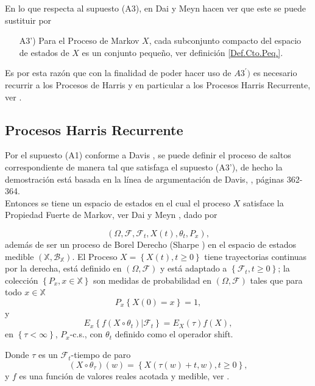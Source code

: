 En lo que respecta al supuesto (A3), en Dai y Meyn \cite{DaiSean}
hacen ver que este se puede sustituir por

\begin{itemize}
\item[A3')] Para el Proceso de Markov $X$, cada subconjunto
compacto del espacio de estados de $X$ es un conjunto peque\~no,
ver definici\'on \ref{Def.Cto.Peq.}.
\end{itemize}

Es por esta raz\'on que con la finalidad de poder hacer uso de
$A3^{'})$ es necesario recurrir a los Procesos de Harris y en
particular a los Procesos Harris Recurrente, ver \cite{Dai,
DaiSean}.
\subsection{Procesos Harris Recurrente}

Por el supuesto (A1) conforme a Davis \cite{Davis}, se puede
definir el proceso de saltos correspondiente de manera tal que
satisfaga el supuesto (A3'), de hecho la demostraci\'on est\'a
basada en la l\'inea de argumentaci\'on de Davis, \cite{Davis},
p\'aginas 362-364.\\

Entonces se tiene un espacio de estados en el cual el proceso $X$
satisface la Propiedad Fuerte de Markov, ver Dai y Meyn
\cite{DaiSean}, dado por

\[\left(\Omega,\mathcal{F},\mathcal{F}_{t},X\left(t\right),\theta_{t},P_{x}\right),\]
adem\'as de ser un proceso de Borel Derecho (Sharpe \cite{Sharpe})
en el espacio de estados medible
$\left(\mathbb{X},\mathcal{B}_\mathbb{X}\right)$. El Proceso
$X=\left\{X\left(t\right),t\geq0\right\}$ tiene trayectorias
continuas por la derecha, est\'a definido en
$\left(\Omega,\mathcal{F}\right)$ y est\'a adaptado a
$\left\{\mathcal{F}_{t},t\geq0\right\}$; la colecci\'on
$\left\{P_{x},x\in \mathbb{X}\right\}$ son medidas de probabilidad
en $\left(\Omega,\mathcal{F}\right)$ tales que para todo $x\in
\mathbb{X}$
\[P_{x}\left\{X\left(0\right)=x\right\}=1,\] y
\[E_{x}\left\{f\left(X\circ\theta_{t}\right)|\mathcal{F}_{t}\right\}=E_{X}\left(\tau\right)f\left(X\right),\]
en $\left\{\tau<\infty\right\}$, $P_{x}$-c.s., con $\theta_{t}$
definido como el operador shift.


Donde $\tau$ es un $\mathcal{F}_{t}$-tiempo de paro
\[\left(X\circ\theta_{\tau}\right)\left(w\right)=\left\{X\left(\tau\left(w\right)+t,w\right),t\geq0\right\},\]
y $f$ es una funci\'on de valores reales acotada y medible, ver \cite{Dai, KaspiMandelbaum}.\\

